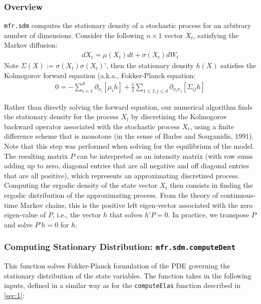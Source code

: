 \documentclass[12pt]{article}
\newcommand{\sdmProg}{mfr.sdm\xspace}
\begin{document}
\subsubsection{Overview}
\texttt{\sdmProg} computes the stationary density of a stochastic process for an arbitrary number of dimensions. Consider the following $n \times 1$ vector $X_t$, satisfying the Markov diffusion:
\begin{align}\label{eq:stateVarProcess}
dX_t = \mu(X_t)dt + \sigma(X_t)dW_t
\end{align}
Note $\Sigma(X) := \sigma(X_t) \sigma(X_t)’$, then the stationary density $h(X)$ satisfies the Kolmogorov forward equation (a.k.a., Fokker-Planck equation:
\begin{align}\label{fp}
0 = - \sum_{i = 1}^d \partial_{x_i} \left[ \mu_i h \right] + \frac{1}{2} \sum_{1 \leq I,j \leq d} \partial_{x_i x_j} \left[ \Sigma _{ij} h \right] 
\end{align}

Rather than directly solving the forward equation, our numerical algorithm finds the stationary density for the process $X_t$ by discretizing the Kolmogorov backward operator associated with the stochastic process $X_t$, using a finite difference scheme that is monotone (in the sense of Barles and Souganidis, 1991). Note that this step was performed when solving for the equilibrium of the model. The resulting matrix $P$ can be interpreted as an intensity matrix (with row sums adding up to zero, diagonal entries that are all negative and off diagonal entries that are all positive), which represents an approximating discretized process. Computing the ergodic density of the state vector $X_t$ then consists in finding the ergodic distribution of the approximating process. From the theory of continuous-time Markov chains, this is the positive left eigen-vector associated with the zero eigen-value of $P$, i.e., the vector $h$ that solves $h’P = 0$. In practice, we transpose $P$ and solve $P’h = 0$ for $h$. 


\subsubsection{Computing Stationary Distribution: \texttt{\sdmProg.computeDent}}\label{subsection:statDent}
This function solves Fokker-Planck formulation of the PDE governing the stationary
distribution of the state variables. The function takes in the following inputs,
defined in a similar way as for the \texttt{computeElas} function described in
\ref{sec:1}:
\end{document}
